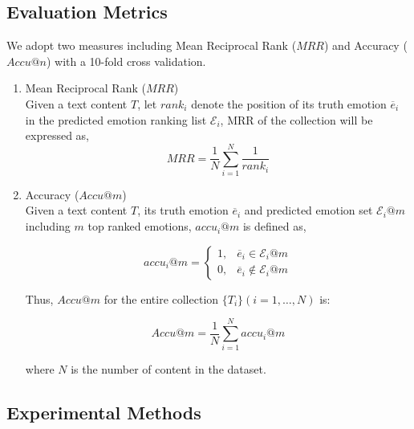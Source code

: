 \documentclass{IEEEtran}
\begin{document}
\subsection{Evaluation Metrics}
We adopt two measures including Mean Reciprocal Rank ($MRR$) and Accuracy ($Accu@n$) with a 10-fold cross validation.
\vspace{-5pt}
\begin{enumerate}
\item Mean Reciprocal Rank ($MRR$) \\
Given a text content $T$, let ${rank_i}$ denote the position of its truth emotion $\overline{e}_i$ in the predicted emotion ranking list $\mathcal{E}_i$, MRR of the collection will be expressed as,
\vspace{-5pt}
\begin{equation}
MRR = \frac{1}{N}\sum_{i=1}^N \frac{1}{rank_i}
\end{equation}
\vspace{-5pt}
\item Accuracy ($Accu@m$)\\
Given a text content $T$, its truth emotion $\overline{e}_i$ and predicted emotion set $\mathcal{E}_i@{m}$ including $m$ top ranked emotions, $accu_i@m$ is defined as,

\vspace{-5pt}
\begin{equation} 
\label {eq:Accu}
accu_i@m = \left\{
\begin{array}{ll}
1, & \overline{e}_i \in \mathcal{E}_i@{m} \\
0, & \overline{e}_i \notin \mathcal{E}_i@{m}
\end{array}
\right.
\end{equation}
\vspace{-5pt}

Thus, $Accu@m$ for the entire collection  $\{T_i\} (i=1,\ldots, N)$ is:

\vspace{-10pt}
\begin{equation}
Accu@m = \frac{1}{N}\sum_{i=1}^N accu_i@m
\end{equation}
\vspace{-10pt}

where $N$ is the number of content in the dataset.
\vspace{-5pt}
\end{enumerate}

\subsection{Experimental Methods}
\end{document}
